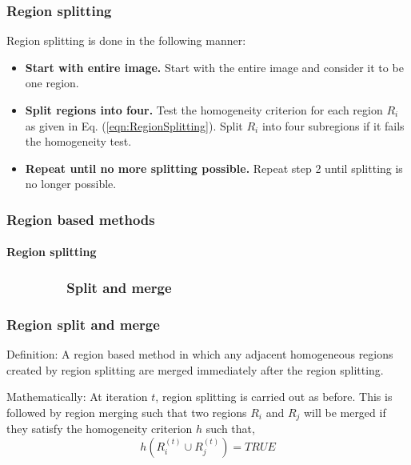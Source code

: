 \begin{frame}
\frametitle{Region splitting}
\logoCSIPCPL\mypagenum
	Region splitting is done in the following manner:	
	\begin{itemize}
		\item \textbf{Start with entire image.}  Start with the entire image and consider it to be one region.
		\item \textbf{Split regions into four.} Test the homogeneity criterion for each region $R_i$ as given in Eq. (\ref{eqn:RegionSplitting}).  Split $R_i$ into four subregions if it fails the homogeneity test.
		\item \textbf{Repeat until no more splitting possible.} Repeat step 2 until splitting is no longer possible.
	\end{itemize}
\end{frame}




\begin{frame}
\frametitle{Region based methods} 
\framesubtitle{Region splitting}
\logoCSIPCPL\mypagenum
\begin{figure}[!htp]
\begin{center}
    \hspace{0.1cm}
\end{center}\end{figure}
\end{frame}






\subsubsection{\ \ \ \ \ \ \ \ Split and merge}
\begin{frame}
\frametitle{Region split and merge}
\logoCSIPCPL\mypagenum
	\begin{block}{Definition:}
		A region based method in which any adjacent homogeneous regions created by region splitting are merged immediately after the region splitting.
	\end{block}
	\begin{block}{Mathematically:}  
		At iteration $t$, region splitting is carried out as before.  This is followed by region merging such that two regions $R_i$ and $R_j$ will be merged if they satisfy the homogeneity criterion $h$ such that,
		\begin{equation}
			h(R_i^{(t)} \cup R_j^{(t)}) = TRUE \label{eqn:RegionSplittingAndMerging}
		\end{equation}
	\end{block}
\end{frame}








